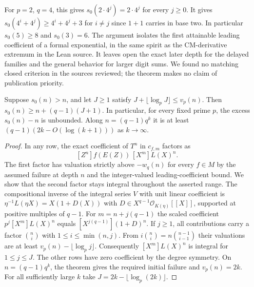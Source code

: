 For $p=2$, $q=4$, this gives $s_0(2\cdot4^j)=2\cdot4^j$ for every $j\ge0$. It gives $s_0(4^i+4^j)\ge 4^i+4^j+3$ for $i\ne j$ since $1+1$ carries in base two. In particular $s_0(5)\ge8$ and $s_0(3)=6$. The argument isolates the first attainable leading coefficient of a formal exponential, in the same spirit as the CM-derivative extremum in the Lean source. It leaves open the exact later depth for the delayed families and the general behavior for larger digit sums. We found no matching closed criterion in the sources reviewed; the theorem makes no claim of publication priority.

\begin{corollary}\label{cor:depth-gap}
Suppose $s_0(n)>n$, and let $J\ge1$ satisfy $J+\lfloor\log_p J\rfloor\le v_p(n)$. Then $s_0(n)\ge n+(q-1)(J+1)$. In particular, for every fixed prime $p$, the excess $s_0(n)-n$ is unbounded. Along $n=(q-1)q^k$ it is at least $(q-1)(2k-O(\log(k+1)))$ as $k\to\infty$.
\end{corollary}
\begin{proof}
In any row, the exact coefficient of $T^n$ in $c_{f,m}$ factors as
\[
 [Z^n]f(E(Z))\,[X^m]L(X)^n.
\]
The first factor has valuation strictly above $-w_q(n)$ for every $f\in M$ by the assumed failure at depth $n$ and the integer-valued leading-coefficient bound. We show that the second factor stays integral throughout the asserted range. The compositional inverse of the integral series $V$ with unit linear coefficient is $\eta^{-1}L(\eta X)=X(1+D(X))$ with $D\in X^{q-1}\mathcal O_{K(\eta)}[[X]]$, supported at positive multiples of $q-1$. For $m=n+j(q-1)$ the scaled coefficient $p^j[X^m]L(X)^n$ equals $[X^{j(q-1)}](1+D)^n$. If $j\ge1$, all contributions carry a factor $\binom ni$ with $1\le i\le\min(n,j)$. From $i\binom ni=n\binom{n-1}{i-1}$ their valuations are at least $v_p(n)-\lfloor\log_p j\rfloor$. Consequently $[X^m]L(X)^n$ is integral for $1\le j\le J$. The other rows have zero coefficient by the degree symmetry. On $n=(q-1)q^k$, the theorem gives the required initial failure and $v_p(n)=2k$. For all sufficiently large $k$ take $J=2k-\lfloor\log_p(2k)\rfloor$.
\end{proof}
